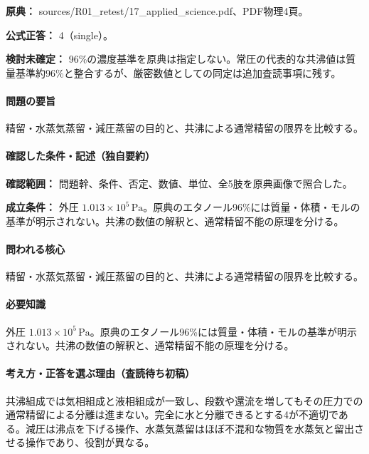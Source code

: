 \noindent\textbf{原典：} sources/R01\_retest/17\_applied\_science.pdf、PDF物理4頁。

\textbf{公式正答：} 4（single）。

\par\textbf{検討未確定：} 96\%の濃度基準を原典は指定しない。常圧の代表的な共沸値は質量基準約96\%と整合するが、厳密数値としての同定は追加査読事項に残す。

\paragraph{問題の要旨} 精留・水蒸気蒸留・減圧蒸留の目的と、共沸による通常精留の限界を比較する。

\paragraph{確認した条件・記述（独自要約）}\mbox{}\par

\noindent\textbf{確認範囲：} 問題幹、条件、否定、数値、単位、全5肢を原典画像で照合した。\par

\noindent\textbf{成立条件：} 外圧 \(1.013\times10^5\,\mathrm{Pa}\)。原典のエタノール96\%には質量・体積・モルの基準が明示されない。共沸の数値の解釈と、通常精留不能の原理を分ける。\par

\paragraph{問われる核心} 精留・水蒸気蒸留・減圧蒸留の目的と、共沸による通常精留の限界を比較する。

\paragraph{必要知識} 外圧 \(1.013\times10^5\,\mathrm{Pa}\)。原典のエタノール96\%には質量・体積・モルの基準が明示されない。共沸の数値の解釈と、通常精留不能の原理を分ける。

\paragraph{考え方・正答を選ぶ理由（査読待ち初稿）} 共沸組成では気相組成と液相組成が一致し、段数や還流を増してもその圧力での通常精留による分離は進まない。完全に水と分離できるとする4が不適切である。減圧は沸点を下げる操作、水蒸気蒸留はほぼ不混和な物質を水蒸気と留出させる操作であり、役割が異なる。

